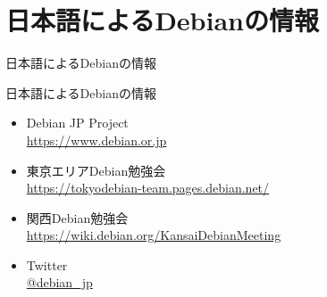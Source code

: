 











\section{日本語によるDebianの情報}

\begin{frame}\begin{center}\Huge{日本語によるDebianの情報}\end{center}\end{frame}

\begin{frame}{日本語によるDebianの情報}
\begin{itemize}
  \item Debian JP Project \\
      \url{https://www.debian.or.jp}
  \item 東京エリアDebian勉強会\\
      \url{https://tokyodebian-team.pages.debian.net/}
  \item 関西Debian勉強会 \\
      \url{https://wiki.debian.org/KansaiDebianMeeting}
  \item Twitter \\
      \url{@debian_jp}
\end{itemize}
\end{frame}

